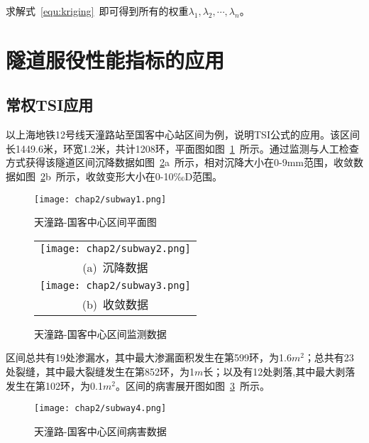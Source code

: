 求解式~\ref{equ:kriging}~即可得到所有的权重${{\lambda }_{1}},{{\lambda }_{2}},\cdots ,{{\lambda }_{n}}$。

\section{隧道服役性能指标的应用}

\subsection{常权TSI应用}

以上海地铁12号线天潼路站至国客中心站区间为例，说明TSI公式的应用。该区间长1449.6米，环宽1.2米，共计1208环，平面图如图~\ref{fig:天潼路-国客中心区间平面图}~所示。通过监测与人工检查方式获得该隧道区间沉降数据如图~\ref{fig:天潼路-国客中心区间监测数据}a~所示，相对沉降大小在0-9mm范围，收敛数据如图~\ref{fig:天潼路-国客中心区间监测数据}b~所示，收敛变形大小在0-10‰D范围。

\begin{figure}[htb!]
    \centering
    \texttt{[image: chap2/subway1.png]}
    \caption{天潼路-国客中心区间平面图}
    \label{fig:天潼路-国客中心区间平面图}
\end{figure}

\begin{figure}[htb!] 
    \centering 
    \begin{tabular}{c} 
        \texttt{[image: chap2/subway2.png]} \\ 
        (a)~沉降数据 \\
        \texttt{[image: chap2/subway3.png]} \\ 
        (b)~收敛数据 \\
    \end{tabular}
    \caption{天潼路-国客中心区间监测数据} 
    \label{fig:天潼路-国客中心区间监测数据} 
\end{figure}

区间总共有19处渗漏水，其中最大渗漏面积发生在第599环，为1.6$m^2$；总共有23处裂缝，其中最大裂缝发生在第852环，为1$m$长；以及有12处剥落,其中最大剥落发生在第102环，为0.1$m^2$。区间的病害展开图如图~\ref{fig:天潼路-国客中心区间病害数据}~所示。

\begin{figure}[htb!]
    \centering
    \texttt{[image: chap2/subway4.png]}
    \caption{天潼路-国客中心区间病害数据}
    \label{fig:天潼路-国客中心区间病害数据}
\end{figure}


